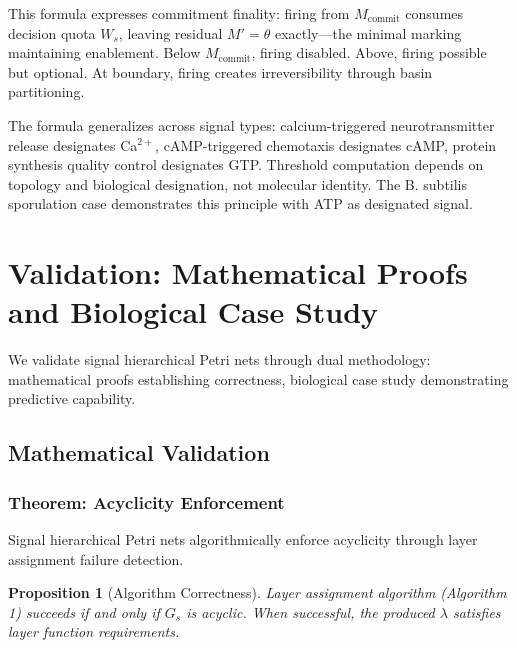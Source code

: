 \documentclass[10pt,letterpaper]{article}
\newtheorem{proposition}{Proposition}
\begin{document}
This formula expresses commitment finality: firing from $M_{\text{commit}}$ consumes decision quota $W_s$, leaving residual $M' = \theta$ exactly---the minimal marking maintaining enablement. Below $M_{\text{commit}}$, firing disabled. Above, firing possible but optional. At boundary, firing creates irreversibility through basin partitioning.

The formula generalizes across signal types: calcium-triggered neurotransmitter release designates Ca$^{2+}$, cAMP-triggered chemotaxis designates cAMP, protein synthesis quality control designates GTP. Threshold computation depends on topology and biological designation, not molecular identity. The B. subtilis sporulation case demonstrates this principle with ATP as designated signal.

\section{Validation: Mathematical Proofs and Biological Case Study}

We validate signal hierarchical Petri nets through dual methodology: mathematical proofs establishing correctness, biological case study demonstrating predictive capability.

\subsection{Mathematical Validation}

\subsubsection{Theorem: Acyclicity Enforcement}

Signal hierarchical Petri nets algorithmically enforce acyclicity through layer assignment failure detection.

\begin{proposition}[Algorithm Correctness]
Layer assignment algorithm (Algorithm 1) succeeds if and only if $G_s$ is acyclic. When successful, the produced $\lambda$ satisfies layer function requirements.
\end{proposition}
\end{document}
